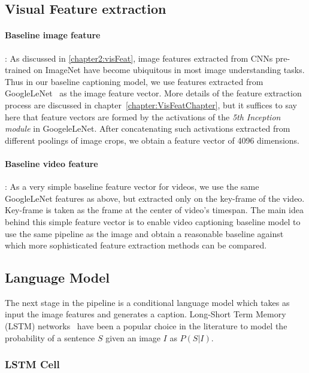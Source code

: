 
\subsection{Visual Feature extraction}

\paragraph{Baseline image feature}: As discussed in \ref{chapter2:visFeat},
image features extracted from CNNs pre-trained on ImageNet have become
ubiquitous in most image understanding tasks.
Thus in our baseline captioning model, we use features extracted from
GoogleLeNet~\cite{DBLP:journals/corr/SzegedyLJSRAEVR14} as the image feature
vector. 
More details of the feature extraction process are discussed in
chapter~\ref{chapter:VisFeatChapter}, but it suffices to say here that feature
vectors are formed by the activations of the \emph{5th Inception module} in
GoogeleLeNet.
After concatenating such activations extracted from different
poolings of image crops, we obtain a feature vector of 4096 dimensions.

\paragraph{Baseline video feature}: As a very simple baseline feature vector for
videos, we use the same GoogleLeNet features as above, but extracted only on the
key-frame of the video.
Key-frame is taken as the frame at the center of video's timespan.
The main idea behind this simple feature vector is to enable video captioning
baseline model to use the same pipeline as the image and obtain a reasonable
baseline against which more sophisticated feature extraction methods can be
compared. 

\subsection{Language Model}

The next stage in the pipeline is a conditional language model which
takes as input the image features and generates a caption. 
Long-Short Term Memory (LSTM) networks~\cite{Hochreiter1997} have been a popular
choice in the literature to model the probability of a sentence $S$ given an
image $I$ as $P(S|I)$.

\subsubsection{LSTM Cell}

